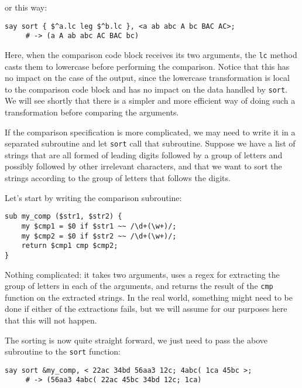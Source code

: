 or this way:
\begin{verbatim}
say sort { $^a.lc leg $^b.lc }, <a ab abc A bc BAC AC>;
     # -> (a A ab abc AC BAC bc)
\end{verbatim}

Here, when the comparison code block receives its two 
arguments, the {\tt lc} method casts them to lowercase 
before performing the comparison. Notice that this has 
no impact on the case of the output, since the lowercase 
transformation is local to the comparison code block and 
has no impact on the data handled by {\tt sort}. We will 
see shortly that there is a simpler and more efficient 
way of doing such a transformation before comparing the 
arguments.

If the comparison specification is more complicated, we 
may need to write it in a separated subroutine and let 
{\tt sort} call that subroutine. Suppose we have a list 
of strings that are all formed of leading digits 
followed by a group of letters and possibly followed by other 
irrelevant characters, and that we want to sort the 
strings according to the group of letters that follows 
the digits.

Let's start by writing the comparison subroutine:


\begin{verbatim}
sub my_comp ($str1, $str2) {
    my $cmp1 = $0 if $str1 ~~ /\d+(\w+)/; 
    my $cmp2 = $0 if $str2 ~~ /\d+(\w+)/; 
    return $cmp1 cmp $cmp2;
}
\end{verbatim}

Nothing complicated: it takes two arguments, uses a regex 
for extracting the group of letters in each of the 
arguments, and returns the result of the {\tt cmp} 
function on the extracted strings. In the real world, something 
might need to be done if either of the extractions fails, but 
we will assume for our purposes here that this will not happen.

The sorting is now quite straight forward, we just need to 
pass the above subroutine to the {\tt sort} function:

\begin{verbatim}
say sort &my_comp, < 22ac 34bd 56aa3 12c; 4abc( 1ca 45bc >;
     # -> (56aa3 4abc( 22ac 45bc 34bd 12c; 1ca)
\end{verbatim}

